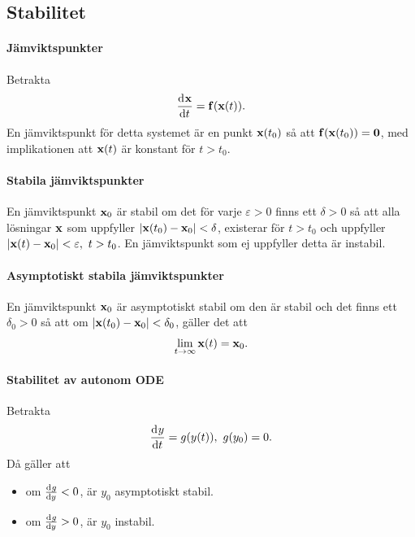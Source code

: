 \subsection{Stabilitet}

\paragraph{Jämviktspunkter}
Betrakta
\begin{align*}
	\dv[]{\vb{x}}{t} (t) = \vb{f}(\vb{x}(t)).
\end{align*}
En jämviktspunkt för detta systemet är en punkt $\vb{x}(t_{0})$ så att $\vb{f}(\vb{x}(t_{0})) = \vb{0}$, med implikationen att $\vb{x}(t)$ är konstant för $t > t_{0}$.

\paragraph{Stabila jämviktspunkter}
En jämviktspunkt $\vb{x}_{0}$ är stabil om det för varje $\varepsilon > 0$ finns ett $\delta > 0$ så att alla lösningar $\vb{x}$ som uppfyller $\abs{\vb{x}(t_{0}) - \vb{x}_{0}} < \delta$, existerar för $t > t_{0}$ och uppfyller $\abs{\vb{x}(t) - \vb{x}_{0}} < \varepsilon,\ t > t_{0}$. En jämviktspunkt som ej uppfyller detta är instabil.

\paragraph{Asymptotiskt stabila jämviktspunkter}
En jämviktspunkt $\vb{x}_{0}$ är asymptotiskt stabil om den är stabil och det finns ett $\delta_{0} > 0$ så att om $\abs{\vb{x}(t_{0}) - \vb{x}_{0}} < \delta_{0}$, gäller det att
\begin{align*}
	\lim\limits_{t\to\infty}\vb{x}(t) = \vb{x}_{0}.
\end{align*}

\paragraph{Stabilitet av autonom ODE}
Betrakta
\begin{align*}
\dv[]{y}{t} (t) = g(y(t)),\ g(y_{0}) = 0.
\end{align*}
Då gäller att
\begin{itemize}
	\item om $\dv[]{g}{y} (y_{0}) < 0$, är $y_{0}$ asymptotiskt stabil.
	\item om $\dv[]{g}{y} (y_{0}) > 0$, är $y_{0}$ instabil.
\end{itemize}

